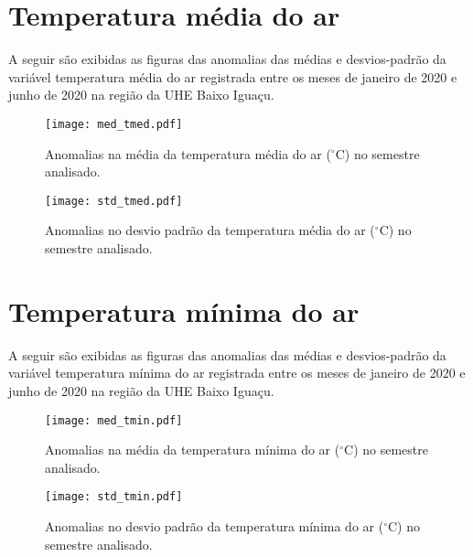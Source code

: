 \documentclass[a4paper,12pt]{article}
\begin{document}
        \section{Temperatura média do ar }
        \hspace{0.5cm} A seguir são exibidas as figuras das anomalias das médias e desvios-padrão da variável temperatura média do ar 
        registrada entre os meses de janeiro de 2020 e junho de 2020 na região da UHE Baixo Iguaçu.
        
        \begin{figure}[!htb]
        \centering
        \texttt{[image: med\_tmed.pdf]}
        \caption{Anomalias na média da temperatura média do ar ($^\circ$C) no semestre analisado.}
        \label{fig:figmed_tmed}
        \end{figure}
        
        \begin{figure}[!htb]
        \centering
        \texttt{[image: std\_tmed.pdf]}
        \caption{Anomalias no desvio padrão da temperatura média do ar ($^\circ$C) no semestre analisado.}
        \label{fig:figstd_tmed}
        \end{figure}  
        
        
        \newpage
        
        \section{Temperatura mínima do ar }
        \hspace{0.5cm} A seguir são exibidas as figuras das anomalias das médias e desvios-padrão da variável temperatura mínima do ar 
        registrada entre os meses de janeiro de 2020 e junho de 2020 na região da UHE Baixo Iguaçu.
        
        \begin{figure}[!htb]
        \centering
        \texttt{[image: med\_tmin.pdf]}
        \caption{Anomalias na média da temperatura mínima do ar ($^\circ$C) no semestre analisado.}
        \label{fig:figmed_tmin}
        \end{figure}
        
        \begin{figure}[!htb]
        \centering
        \texttt{[image: std\_tmin.pdf]}
        \caption{Anomalias no desvio padrão da temperatura mínima do ar ($^\circ$C) no semestre analisado.}
        \label{fig:figstd_tmin}
        \end{figure}  
        
\end{document}
